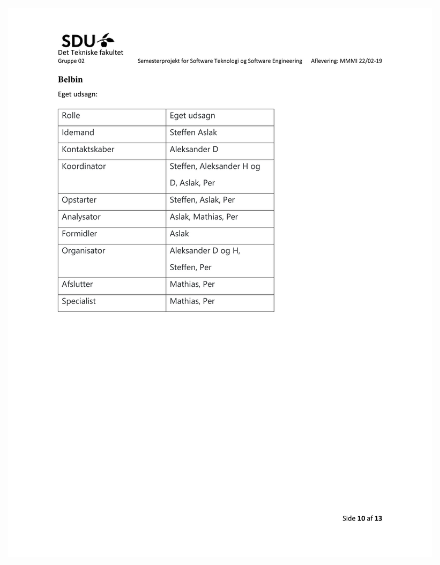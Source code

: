 \begin{figure}[hb]
  \includegraphics[scale = 0.33]{./PNG/Projektforslag/Projektforslag-10.jpg} 
\end{figure}

